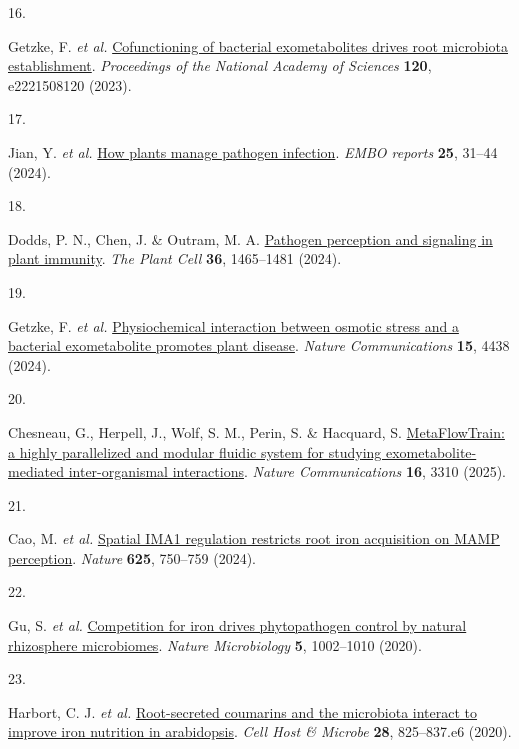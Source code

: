 \documentclass[
  11pt,
  a4paper,
]{report}
\newlength{\cslhangindent}
\newlength{\csllabelwidth}
\newenvironment{CSLReferences}[2] %
 {\begin{list}{}{%
  \setlength{\itemindent}{0pt}
  \setlength{\leftmargin}{0pt}
  \setlength{\parsep}{0pt}
  \ifodd #1
   \setlength{\leftmargin}{\cslhangindent}
   \setlength{\itemindent}{-1\cslhangindent}
  \fi
  \setlength{\itemsep}{#2\baselineskip}}}
 {\end{list}}
\newcommand{\CSLLeftMargin}[1]{\parbox[t]{\csllabelwidth}{\strut#1\strut}}
\newcommand{\CSLRightInline}[1]{\parbox[t]{\linewidth - \csllabelwidth}{\strut#1\strut}}
\begin{document}
\begin{CSLReferences}{0}{0}
\CSLLeftMargin{16. }%
\CSLRightInline{Getzke, F. \emph{et al.}
\href{https://doi.org/10.1073/pnas.2221508120}{Cofunctioning of
bacterial exometabolites drives root microbiota establishment}.
\emph{Proceedings of the National Academy of Sciences} \textbf{120},
e2221508120 (2023).}

\CSLLeftMargin{17. }%
\CSLRightInline{Jian, Y. \emph{et al.}
\href{https://doi.org/10.1038/s44319-023-00023-3}{How plants manage
pathogen infection}. \emph{EMBO reports} \textbf{25}, 31--44 (2024).}

\CSLLeftMargin{18. }%
\CSLRightInline{Dodds, P. N., Chen, J. \& Outram, M. A.
\href{https://doi.org/10.1093/plcell/koae020}{Pathogen perception and
signaling in plant immunity}. \emph{The Plant Cell} \textbf{36},
1465--1481 (2024).}

\CSLLeftMargin{19. }%
\CSLRightInline{Getzke, F. \emph{et al.}
\href{https://doi.org/10.1038/s41467-024-48517-5}{Physiochemical
interaction between osmotic stress and a bacterial exometabolite
promotes plant disease}. \emph{Nature Communications} \textbf{15}, 4438
(2024).}

\CSLLeftMargin{20. }%
\CSLRightInline{Chesneau, G., Herpell, J., Wolf, S. M., Perin, S. \&
Hacquard, S.
\href{https://doi.org/10.1038/s41467-025-58530-x}{MetaFlowTrain: a
highly parallelized and modular fluidic system for studying
exometabolite-mediated inter-organismal interactions}. \emph{Nature
Communications} \textbf{16}, 3310 (2025).}

\CSLLeftMargin{21. }%
\CSLRightInline{Cao, M. \emph{et al.}
\href{https://doi.org/10.1038/s41586-023-06891-y}{Spatial IMA1
regulation restricts root iron acquisition on MAMP perception}.
\emph{Nature} \textbf{625}, 750--759 (2024).}

\CSLLeftMargin{22. }%
\CSLRightInline{Gu, S. \emph{et al.}
\href{https://doi.org/10.1038/s41564-020-0719-8}{Competition for iron
drives phytopathogen control by natural rhizosphere microbiomes}.
\emph{Nature Microbiology} \textbf{5}, 1002--1010 (2020).}

\CSLLeftMargin{23. }%
\CSLRightInline{Harbort, C. J. \emph{et al.}
\href{https://doi.org/10.1016/j.chom.2020.09.006}{Root-secreted
coumarins and the microbiota interact to improve iron nutrition in
arabidopsis}. \emph{Cell Host \& Microbe} \textbf{28}, 825--837.e6
(2020).}


\end{CSLReferences}
\end{document}
